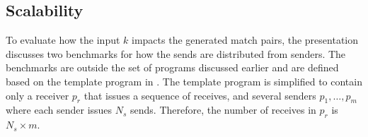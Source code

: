  





\subsection{Scalability}
To evaluate how the input $k$ impacts the generated match pairs, the presentation discusses two benchmarks for how the sends are distributed from senders. The benchmarks are outside the set of programs discussed earlier and are defined based on the template program in . The template program is simplified to contain only a receiver $p_r$ that issues a sequence of receives, and several senders $p_1,\ldots,p_m$ where each sender issues $N_s$ sends. Therefore, the number of receives in $p_r$ is $N_s\times m$.

\examplefigtemplate

